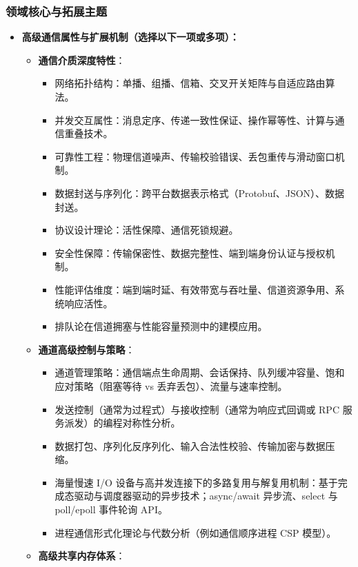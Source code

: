 \subsubsection{领域核心与拓展主题}
\begin{itemize}
    \item \textbf{高级通信属性与扩展机制（选择以下一项或多项）：}
    \begin{itemize}
        \item \textbf{通信介质深度特性}：
        \begin{itemize}
            \item 网络拓扑结构：单播、组播、信箱、交叉开关矩阵与自适应路由算法。
            \item 并发交互属性：消息定序、传递一致性保证、操作幂等性、计算与通信重叠技术。
            \item 可靠性工程：物理信道噪声、传输校验错误、丢包重传与滑动窗口机制。
            \item 数据封送与序列化：跨平台数据表示格式（Protobuf、JSON）、数据封送。
            \item 协议设计理论：活性保障、通信死锁规避。
            \item 安全性保障：传输保密性、数据完整性、端到端身份认证与授权机制。
            \item 性能评估维度：端到端时延、有效带宽与吞吐量、信道资源争用、系统响应活性。
            \item 排队论在信道拥塞与性能容量预测中的建模应用。
        \end{itemize}
        \item \textbf{通道高级控制与策略}：
        \begin{itemize}
            \item 通道管理策略：通信端点生命周期、会话保持、队列缓冲容量、饱和应对策略（阻塞等待 vs 丢弃丢包）、流量与速率控制。
            \item 发送控制（通常为过程式）与接收控制（通常为响应式回调或 RPC 服务派发）的编程对称性分析。
            \item 数据打包、序列化反序列化、输入合法性校验、传输加密与数据压缩。
            \item 海量慢速 I/O 设备与高并发连接下的多路复用与解复用机制：基于完成态驱动与调度器驱动的异步技术；async/await 异步流、select 与 poll/epoll 事件轮询 API。
            \item 进程通信形式化理论与代数分析（例如通信顺序进程 CSP 模型）。
        \end{itemize}
        \item \textbf{高级共享内存体系}：

\end{itemize}
\end{itemize}
